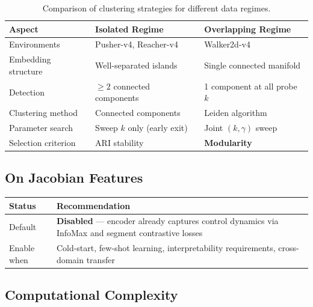 \documentclass[11pt,a4paper]{article}
\begin{document}
\begin{table}[h]
\centering
\begin{tabular}{@{}lll@{}}
\toprule
\textbf{Aspect} & \textbf{Isolated Regime} & \textbf{Overlapping Regime} \\
\midrule
Environments & Pusher-v4, Reacher-v4 & Walker2d-v4 \\
Embedding structure & Well-separated islands & Single connected manifold \\
Detection & $\geq 2$ connected components & 1 component at all probe $k$ \\
Clustering method & Connected components & Leiden algorithm \\
Parameter search & Sweep $k$ only (early exit) & Joint $(k, \gamma)$ sweep \\
Selection criterion & ARI stability & \textbf{Modularity} \\
\bottomrule
\end{tabular}
\caption{Comparison of clustering strategies for different data regimes.}
\end{table}

\subsection{On Jacobian Features}

\begin{table}[h]
\centering
\begin{tabular}{@{}lp{10cm}@{}}
\toprule
\textbf{Status} & \textbf{Recommendation} \\
\midrule
Default & \textbf{Disabled} --- encoder already captures control dynamics via InfoMax and segment contrastive losses \\
Enable when & Cold-start, few-shot learning, interpretability requirements, cross-domain transfer \\
\bottomrule
\end{tabular}
\end{table}

\subsection{Computational Complexity}
\end{document}
